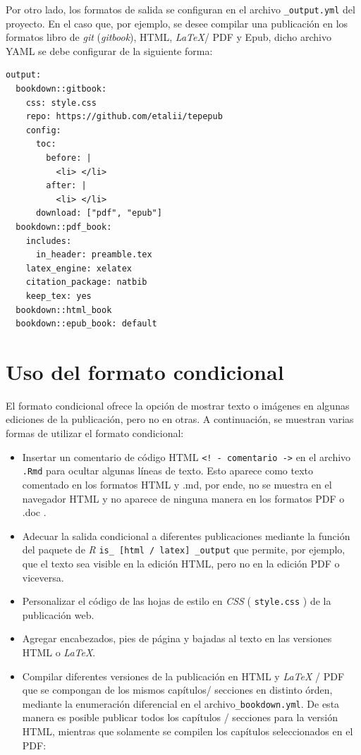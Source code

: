 \documentclass[
]{book}
\begin{document}
Por otro lado, los formatos de salida se configuran en el archivo \texttt{\_output.yml} del proyecto. En el caso que, por ejemplo, se desee compilar una publicación en los formatos libro de \emph{git} (\emph{gitbook}), HTML, \emph{LaTeX}/ PDF y Epub, dicho archivo YAML se debe configurar de la siguiente forma:

\begin{verbatim}
output:
  bookdown::gitbook:
    css: style.css
    repo: https://github.com/etalii/tepepub
    config:
      toc:
        before: |
          <li> </li>
        after: |
          <li> </li>
      download: ["pdf", "epub"]
  bookdown::pdf_book:
    includes:
      in_header: preamble.tex
    latex_engine: xelatex
    citation_package: natbib
    keep_tex: yes
  bookdown::html_book
  bookdown::epub_book: default
\end{verbatim}

\hypertarget{uso-del-formato-condicional}{%
\section{Uso del formato condicional}\label{uso-del-formato-condicional}}

El formato condicional ofrece la opción de mostrar texto o imágenes en algunas ediciones de la publicación, pero no en otras. A continuación, se muestran varias formas de utilizar el formato condicional:

\begin{itemize}
\item
  Insertar un comentario de código HTML \texttt{\textless{}!\ -\ comentario\ -\textgreater{}} en el archivo \texttt{.Rmd} para ocultar algunas líneas de texto. Esto aparece como texto comentado en los formatos HTML y .md, por ende, no se muestra en el navegador HTML y no aparece de ninguna manera en los formatos PDF o .doc .
\item
  Adecuar la salida condicional a diferentes publicaciones mediante la función del paquete de \emph{R} \texttt{is\_\ {[}html\ /\ latex{]}\ \_output} que permite, por ejemplo, que el texto sea visible en la edición HTML, pero no en la edición PDF o viceversa.
\item
  Personalizar el código de las hojas de estilo en \emph{CSS} ( \texttt{style.css} ) de la publicación web.
\item
  Agregar encabezados, pies de página y bajadas al texto en las versiones HTML o \emph{LaTeX}.
\item
  Compilar diferentes versiones de la publicación en HTML y \emph{LaTeX} / PDF que se compongan de los mismos capítulos/ secciones en distinto órden, mediante la enumeración diferencial en el archivo\texttt{\_bookdown.yml}. De esta manera es posible publicar todos los capítulos / secciones para la versión HTML, mientras que solamente se compilen los capítulos seleccionados en el PDF:
\end{itemize}
\end{document}
